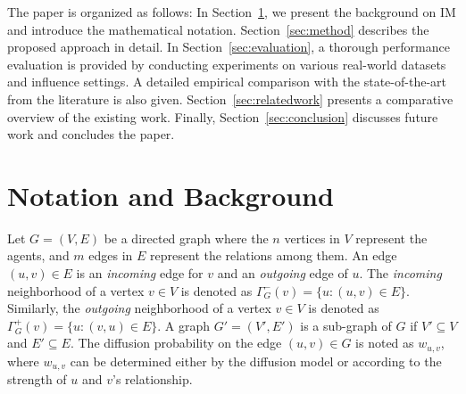 \documentclass[review]{elsarticle}
\begin{document}
The paper is organized as follows: 
In Section~\ref{sec:background}, we present 
the background on IM and introduce the mathematical notation. 
Section~\ref{sec:method} describes the proposed approach in detail.
In Section~\ref{sec:evaluation}, a thorough performance evaluation is provided by conducting experiments on various real-world datasets and influence settings. A detailed empirical comparison with the state-of-the-art from the literature is also given. Section~\ref{sec:relatedwork} presents a comparative overview of the existing work. Finally, Section~\ref{sec:conclusion} discusses future work and concludes the paper.

\section{Notation and Background}\label{sec:background}

Let $G = (V,E)$ be a directed graph where the $n$ vertices in $V$ represent the agents, and $m$ edges in $E$ represent the relations among them. An edge $(u,v) \in E$ is an {\em incoming} edge for $v$ and an {\em outgoing} edge of $u$. The {\em incoming} neighborhood of a vertex $v \in V$ is denoted as $\Gamma^-_{G}(v) = \{u: (u,v) \in E\}$. Similarly, the {\em outgoing} neighborhood of a vertex $v \in V$ is denoted as $\Gamma^+_{G}(v) = \{u: (v,u) \in E\}$. A graph $G' = (V',E')$ is a sub-graph of $G$ if $V' \subseteq V$ and $E' \subseteq E$. The diffusion probability on the edge $(u, v) \in G$ is noted as $w_{u,v}$, where $w_{u,v}$ can be determined either by the diffusion model or according to the strength of $u$ and $v$'s relationship.
\end{document}
